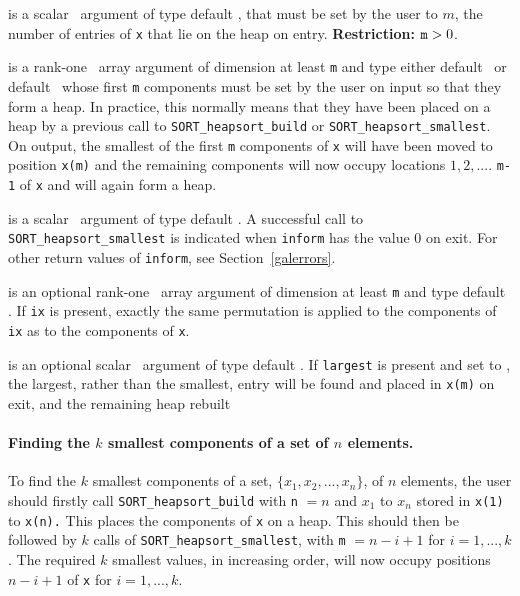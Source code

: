 \documentclass{galahad}
\newcommand{\packagename}{SORT}
\begin{document}
\vspace*{-3mm}
\begin{description}
 is a scalar \intentin\ argument of type default
\integer, that must be set by the user to $m$, the
number of entries of {\tt x} that lie on the heap on entry.
{\bf Restriction:} ${\tt m} > 0$.

 is a rank-one \intentinout\ array argument of
dimension at least {\tt m} and type either default
\integer\ or default \realdp\, whose first {\tt m} components must be set by
the user on input so that they form a heap.
In practice, this normally means that they have been placed on a heap
by a previous call to
{\tt \packagename\_heapsort\_build}
or
{\tt \packagename\_heapsort\_smallest}.
On output, the smallest of the first {\tt m} components of {\tt x} will have
been moved to position {\tt x(m)} and the remaining components will now occupy
locations $1,  2,  .... $ {\tt m-1} of {\tt x} and will again form a heap.

 is a scalar \intentout\ argument of type default \integer.
A successful call to {\tt \packagename\_heapsort\_smallest}
is indicated when {\tt inform} has the value 0 on exit.
For other return values of {\tt inform}, see Section~\ref{galerrors}.

 is an optional rank-one \intentinout\ array argument of
dimension at least {\tt m} and type default \integer.
If {\tt ix} is present, exactly the same permutation is applied to the
components of {\tt ix} as to the components of {\tt x}.

 is an optional scalar \intentin\ argument
of type default \integer.
If {\tt largest} is present and set to \true, the largest, rather than the
smallest, entry will be found and placed in {\tt x(m)} on exit, and
the remaining heap rebuilt

\end{description}


\paragraph{Finding the $k$ smallest components of a set of $n$ elements.}

To find the $k$ smallest components of a set,
$\{ x_1 ,   x_2 ,  ...  ,  x_n \}$, of $n$ elements, the user should firstly
call {\tt \packagename\_heapsort\_build} with {\tt n} $= n$ and $x_1 $ to
$x_n $ stored in {\tt x(1)} to {\tt x(n).} This places the components of
{\tt x} on a heap. This should then be followed by $k$ calls of
{\tt \packagename\_heapsort\_smallest}, with
{\tt m} $= n - i + 1$ for $i  =  1,  ... ,   k$.
The required $k$ smallest values, in increasing order, will now
occupy positions $n - i + 1$ of {\tt x} for $i  =  1,  ... ,   k$.
\end{document}
